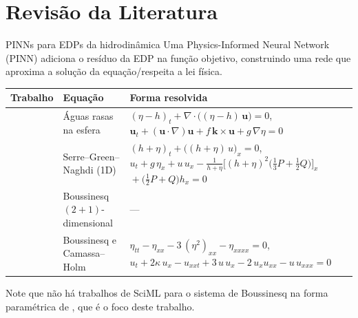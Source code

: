 \section{Revisão da Literatura}

\begin{frame}{PINNs para EDPs da hidrodinâmica}
  Uma Physics-Informed Neural Network (PINN) \parencite{raissi2019} adiciona o resíduo
  da EDP na função objetivo, construindo uma rede que aproxima a solução da equação/respeita a lei física.
  \vspace{4pt}
  \begin{center}
    \scriptsize
    \renewcommand{\arraystretch}{1.3}
    \begin{tabular}{@{}l l p{7.0cm}@{}}
      \toprule
      \textbf{Trabalho} & \textbf{Equação} & \textbf{Forma resolvida} \\
      \midrule
      \textcite{bihlo2022}  & \parbox[t]{2.7cm}{\raggedright Águas rasas na esfera} &
        $(\eta - h)_t + \nabla\!\cdot\bigl((\eta - h)\,\mathbf{u}\bigr) = 0$,\newline
        $\mathbf{u}_t + (\mathbf{u}\cdot\nabla)\mathbf{u} + f\,\mathbf{k}\times\mathbf{u} + g\,\nabla \eta = 0$ \\
      \textcite{jagtap2022} & \parbox[t]{2.7cm}{\raggedright Serre--Green--Naghdi (1D)} &
        $(h + \eta)_t + \bigl((h + \eta)\,u\bigr)_x = 0$,\newline
        $u_t + g\,\eta_x + u\,u_x
          - \tfrac{1}{h + \eta}\bigl[(h + \eta)^2\bigl(\tfrac{1}{3}P + \tfrac{1}{2}Q\bigr)\bigr]_x$\newline
        \hspace*{1.2em}${} + \bigl(\tfrac{1}{2}P + Q\bigr) h_x = 0$ \\
      \textcite{zheng2023}  & \parbox[t]{2.7cm}{\raggedright Boussinesq $(2+1)$-dimensional} & --- \\
      \textcite{wang2024}   & \parbox[t]{2.7cm}{\raggedright Boussinesq e Camassa--Holm} &
        $\eta_{tt} - \eta_{xx} - 3\,(\eta^2)_{xx} - \eta_{xxxx} = 0$,\newline
        $u_t + 2\kappa\,u_x - u_{xxt} + 3\,u\,u_x - 2\,u_x u_{xx} - u\,u_{xxx} = 0$ \\
      \bottomrule
    \end{tabular}
  \end{center}
  \vspace{2pt}
  \textcolor{AmurmapleRed}{Note que não há trabalhos de SciML para o sistema de Boussinesq na forma paramétrica de \textcite{martins2023}, que é o foco deste trabalho.}
\end{frame}


